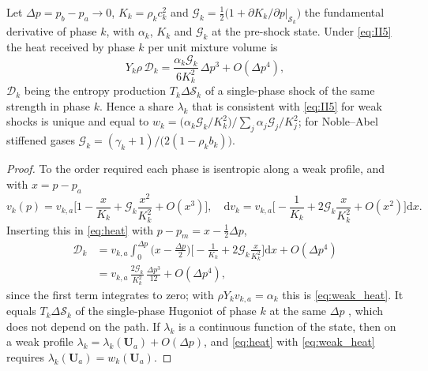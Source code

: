 \begin{theorem}\label{thm:weak}
Let $\Delta p=p_b-p_a\to0$, $K_k=\rho_kc_k^2$ and $\mathcal G_k=\tfrac12\big(1+\partial K_k/\partial p|_{\mathcal S_k}\big)$ the fundamental derivative of phase $k$, with
$\alpha_k$, $K_k$ and $\mathcal G_k$ at the pre-shock state. Under
\eqref{eq:II5} the heat received by phase $k$ per unit mixture volume is
\begin{equation}
Y_k\rho\,\mathcal D_k=\frac{\alpha_k\mathcal G_k}{6K_k^2}\,\Delta p^3+O(\Delta p^4),
\label{eq:weak_heat}
\end{equation}
$\mathcal D_k$ being the entropy production $T_k\Delta\mathcal S_k$ of a single-phase shock of the same strength in phase $k$. Hence a share $\lambda_k$ that is
consistent with \eqref{eq:II5} for weak shocks is unique and equal to
$w_k=\big(\alpha_k\mathcal G_k/K_k^2\big)/\sum_j\alpha_j\mathcal G_j/K_j^2$; for Noble--Abel stiffened gases $\mathcal G_k=(\gamma_k+1)/\big(2(1-\rho_kb_k)\big)$.
\end{theorem}
\begin{proof}
To the order required each phase is isentropic along a weak profile, and with $x=p-p_a$
\[
v_k(p)=v_{k,a}\Big[1-\frac{x}{K_k}+\mathcal G_k\frac{x^2}{K_k^2}+O(x^3)\Big],\quad
\mathrm dv_k=v_{k,a}\Big[-\frac1{K_k}+2\mathcal G_k\frac{x}{K_k^2}+O(x^2)\Big]\mathrm dx .
\]
Inserting this in \eqref{eq:heat} with $p-p_m=x-\tfrac12\Delta p$,
\[
\begin{aligned}
\mathcal D_k&=v_{k,a}\int_0^{\Delta p}\Big(x-\frac{\Delta p}2\Big)\Big[-\frac1{K_k}+2\mathcal G_k\frac{x}{K_k^2}\Big]\mathrm dx+O(\Delta p^4)\\
&=v_{k,a}\,\frac{2\mathcal G_k}{K_k^2}\,\frac{\Delta p^3}{12}+O(\Delta p^4),
\end{aligned}
\]
since the first term integrates to zero; with $\rho Y_kv_{k,a}=\alpha_k$ this is \eqref{eq:weak_heat}. It equals $T_k\Delta\mathcal S_k$ of the single-phase
Hugoniot of phase $k$ at the same $\Delta p$ \cite{LandauLifshitz}, which does not depend on the path. If $\lambda_k$ is a continuous function
of the state, then on a weak profile $\lambda_k=\lambda_k(\mathbf U_a)+O(\Delta p)$, and \eqref{eq:heat} with \eqref{eq:weak_heat} requires $\lambda_k(\mathbf U_a)=w_k(\mathbf U_a)$.
\end{proof}

